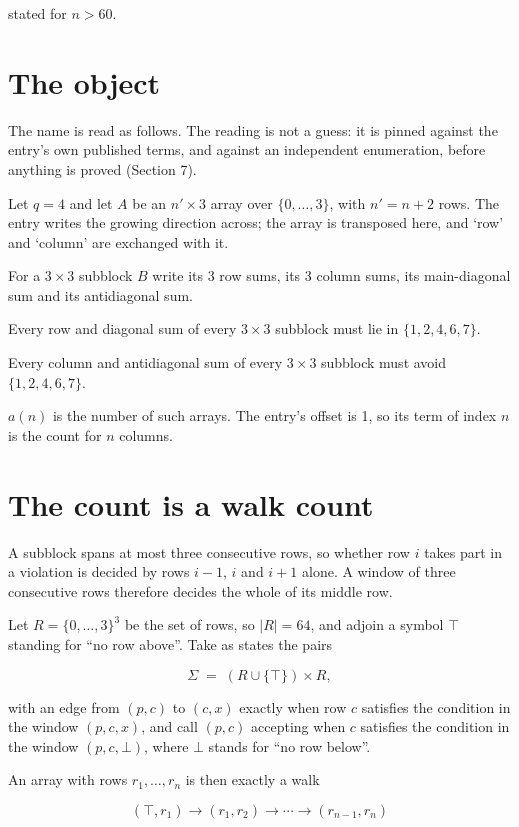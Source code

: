 \documentclass[11pt]{article}
\theoremstyle{definition}
\begin{document}
stated for $n > 60$.

\section{The object}

The name is read as follows. The reading is not a guess: it is pinned against the entry's own published terms, and against an independent enumeration, before anything is proved (Section 7).

Let $q = 4$ and let $A$ be an $n' \times 3$ array over $\{0,\dots,3\}$, with $n' = n + 2$ rows. The entry writes the growing direction across; the array is transposed here, and `row' and `column' are exchanged with it.

For a $3\times3$ subblock $B$ write its 3 row sums, its 3 column sums, its main-diagonal sum and its antidiagonal sum.

Every row and diagonal sum of every $3\times3$ subblock must lie in $\{1, 2, 4, 6, 7\}$.

Every column and antidiagonal sum of every $3\times3$ subblock must avoid $\{1, 2, 4, 6, 7\}$.

$a(n)$ is the number of such arrays. The entry's offset is 1, so its term of index $n$ is the count for $n$ columns.

\section{The count is a walk count}

A subblock spans at most three consecutive rows, so whether row $i$ takes part in a violation is decided by rows $i-1$, $i$ and $i+1$ alone. A window of three consecutive rows therefore decides the whole of its middle row.

Let $R = \{0,\dots,3\}^{3}$ be the set of rows, so $|R| = 64$, and adjoin a symbol $\top$ standing for ``no row above''. Take as states the pairs

\[\Sigma \;=\; (R \cup \{\top\}) \times R,\]

with an edge from $(p,c)$ to $(c,x)$ exactly when row $c$ satisfies the condition in the window $(p,c,x)$, and call $(p,c)$ accepting when $c$ satisfies the condition in the window $(p,c,\bot)$, where $\bot$ stands for ``no row below''.

An array with rows $r_1,\dots,r_n$ is then exactly a walk

\[(\top,r_1) \to (r_1,r_2) \to \cdots \to (r_{n-1},r_n)\]
\end{document}
